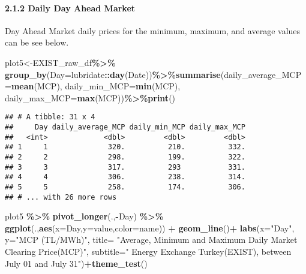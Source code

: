 \documentclass[
]{article}
\newenvironment{Shaded}{\begin{snugshade}}{\end{snugshade}}
\newcommand{\DataTypeTok}[1]{\textcolor[rgb]{0.13,0.29,0.53}{#1}}
\newcommand{\KeywordTok}[1]{\textcolor[rgb]{0.13,0.29,0.53}{\textbf{#1}}}
\newcommand{\NormalTok}[1]{#1}
\newcommand{\OperatorTok}[1]{\textcolor[rgb]{0.81,0.36,0.00}{\textbf{#1}}}
\newcommand{\StringTok}[1]{\textcolor[rgb]{0.31,0.60,0.02}{#1}}
\begin{document}
\hypertarget{daily-day-ahead-market}{%
\paragraph{2.1.2 Daily Day Ahead Market}\label{daily-day-ahead-market}}

Day Ahead Market daily prices for the minimum, maximum, and average
values can be see below.

\begin{Shaded}
\begin{Highlighting}[]
\NormalTok{plot5\textless{}{-}EXIST\_raw\_df}\OperatorTok{\%\textgreater{}\%}\StringTok{ }\KeywordTok{group\_by}\NormalTok{(}\DataTypeTok{Day=}\NormalTok{lubridate}\OperatorTok{::}\KeywordTok{day}\NormalTok{(Date))}\OperatorTok{\%\textgreater{}\%}\KeywordTok{summarise}\NormalTok{(}\DataTypeTok{daily\_average\_MCP=}\KeywordTok{mean}\NormalTok{(MCP), }\DataTypeTok{daily\_min\_MCP=}\KeywordTok{min}\NormalTok{(MCP), }\DataTypeTok{daily\_max\_MCP=}\KeywordTok{max}\NormalTok{(MCP))}\OperatorTok{\%\textgreater{}\%}\KeywordTok{print}\NormalTok{()}
\end{Highlighting}
\end{Shaded}

\begin{verbatim}
## # A tibble: 31 x 4
##     Day daily_average_MCP daily_min_MCP daily_max_MCP
##   <int>             <dbl>         <dbl>         <dbl>
## 1     1              320.          210.          332.
## 2     2              298.          199.          322.
## 3     3              317.          293           331.
## 4     4              306.          238.          314.
## 5     5              258.          174.          306.
## # ... with 26 more rows
\end{verbatim}

\begin{Shaded}
\begin{Highlighting}[]
\NormalTok{plot5 }\OperatorTok{\%\textgreater{}\%}\StringTok{ }\KeywordTok{pivot\_longer}\NormalTok{(.,}\OperatorTok{{-}}\NormalTok{Day) }\OperatorTok{\%\textgreater{}\%}\StringTok{ }\KeywordTok{ggplot}\NormalTok{(.,}\KeywordTok{aes}\NormalTok{(}\DataTypeTok{x=}\NormalTok{Day,}\DataTypeTok{y=}\NormalTok{value,}\DataTypeTok{color=}\NormalTok{name)) }\OperatorTok{+}\StringTok{ }\KeywordTok{geom\_line}\NormalTok{()}\OperatorTok{+}
\StringTok{      }\KeywordTok{labs}\NormalTok{(}\DataTypeTok{x=}\StringTok{"Day"}\NormalTok{, }\DataTypeTok{y=}\StringTok{"MCP (TL/MWh)"}\NormalTok{, }
           \DataTypeTok{title=}  \StringTok{"Average, Minimum and Maximum Daily Market Clearing Price(MCP)"}\NormalTok{,}
           \DataTypeTok{subtitle=}\StringTok{" Energy Exchange Turkey(EXIST), between July 01 and July 31"}\NormalTok{)}\OperatorTok{+}\KeywordTok{theme\_test}\NormalTok{()}
\end{Highlighting}
\end{Shaded}
\end{document}
